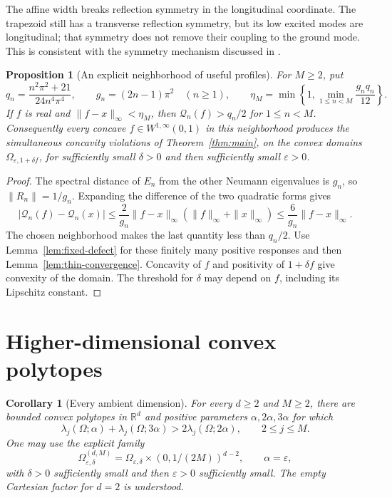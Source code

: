 \documentclass[11pt,a4paper]{article}
\newtheorem{proposition}[theorem]{Proposition}
\newtheorem{corollary}[theorem]{Corollary}
\theoremstyle{definition}\newtheorem{definition}[theorem]{Definition}
\theoremstyle{remark}\newtheorem{remark}[theorem]{Remark}
\begin{document}
The affine width breaks reflection symmetry in the longitudinal
coordinate. The trapezoid still has a transverse reflection
symmetry, but its low excited modes are longitudinal; that
symmetry does not remove their coupling to the ground mode.
This is consistent with the symmetry mechanism discussed in
\cite{Laugesen2019}.

\begin{proposition}[An explicit neighborhood of useful profiles]
\label{prop:profile-neighborhood}
For $M\geq2$, put
\[
 q_n=\frac{n^2\pi^2+21}{24n^4\pi^4},\qquad
 g_n=(2n-1)\pi^2\quad(n\geq1),\qquad
 \eta_M=\min\left\{1,\min_{1\leq n<M}\frac{g_nq_n}{12}\right\}.
\]
If $f$ is real and $\|f-x\|_\infty<\eta_M$, then
$\mathcal Q_n(f)>q_n/2$ for $1\leq n<M$.
Consequently every concave $f\in W^{1,\infty}(0,1)$ in this
neighborhood produces the simultaneous concavity violations of
Theorem~\ref{thm:main}, on the convex domains
$\Omega_{\varepsilon,1+\delta f}$, for sufficiently small
$\delta>0$ and then sufficiently small $\varepsilon>0$.
\end{proposition}
\begin{proof}
The spectral distance of $E_n$ from the other Neumann eigenvalues
is $g_n$, so $\|R_n\|=1/g_n$. Expanding the difference of the two
quadratic forms gives
\[
 |\mathcal Q_n(f)-\mathcal Q_n(x)|
 \leq\frac{2}{g_n}\|f-x\|_\infty(\|f\|_\infty+\|x\|_\infty)
 \leq\frac{6}{g_n}\|f-x\|_\infty.
\]
The chosen neighborhood makes the last quantity less than $q_n/2$.
Use Lemma~\ref{lem:fixed-defect} for these finitely many positive
responses and then Lemma~\ref{lem:thin-convergence}. Concavity of
$f$ and positivity of $1+\delta f$ give convexity of the domain.
The threshold for $\delta$ may depend on $f$, including its
Lipschitz constant.
\end{proof}

\section{Higher-dimensional convex polytopes}
\begin{corollary}[Every ambient dimension]
\label{cor:all-dimensions}
For every $d\geq2$ and $M\geq2$, there are bounded convex
polytopes in $\mathbb R^d$ and positive parameters
$\alpha,2\alpha,3\alpha$ for which
\[
 \lambda_j(\Omega;\alpha)+\lambda_j(\Omega;3\alpha)
      >2\lambda_j(\Omega;2\alpha),\qquad 2\leq j\leq M.
\]
One may use the explicit family
\begin{equation}\label{eq:product-polytopes}
 \Omega_{\varepsilon,\delta}^{(d,M)}
 =\Omega_{\varepsilon,\delta}\times(0,1/(2M))^{d-2},
 \qquad \alpha=\varepsilon,
\end{equation}
with $\delta>0$ sufficiently small and then $\varepsilon>0$
sufficiently small. The empty Cartesian factor for $d=2$ is
understood.
\end{corollary}
\end{document}
